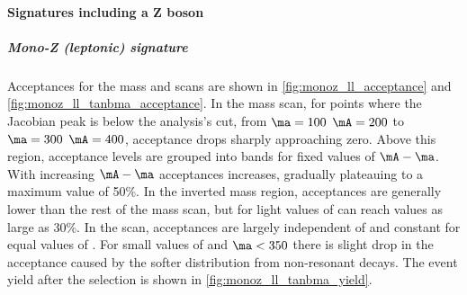 \paragraph{Signatures including a Z boson}

\subparagraph{Mono-Z (leptonic) signature}

Acceptances for the mass and \tanb scans are shown in \autoref{fig:monoz_ll_acceptance} and \autoref{fig:monoz_ll_tanbma_acceptance}.  
In the mass scan, for points where the Jacobian peak is below the analysis's \MET cut, from $\ma = 100$ $\mA = 200$ to $\ma = 300$ $\mA = 400$, 
acceptance drops sharply approaching zero.  Above this region, acceptance levels are grouped into bands for fixed values of $\mA-\ma$. 
With increasing $\mA-\ma$ acceptances increases, gradually plateauing to a maximum value of 50\%.  In the inverted mass region, 
acceptances are generally lower than the rest of the mass scan, but for light values of \ma can reach values as large as 30\%.
In the \tanb scan, acceptances are largely independent of \tanb and constant for equal values of \ma.  For small values of \tanb and
$\ma < 350$ \GeV  there is slight drop in the acceptance caused by the softer \MET distribution from non-resonant decays. The event yield after the selection is shown in \autoref{fig:monoz_ll_tanbma_yield}.  

